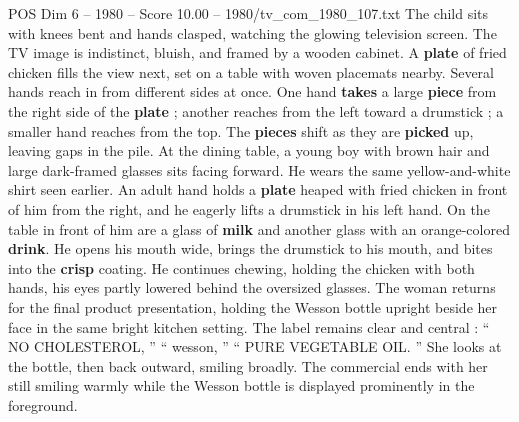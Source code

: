 \begin{textsample}{POS Dim 6 – 1980 – Score 10.00 – 1980/tv\_com\_1980\_107.txt}
The child sits with knees bent and hands clasped, watching the glowing television screen.
The TV image is indistinct, bluish, and framed by a wooden cabinet.
A \textbf{plate} of fried chicken fills the view next, set on a table with woven placemats nearby.
Several hands reach in from different sides at once.
One hand \textbf{takes} a large \textbf{piece} from the right side of the \textbf{plate} ; another reaches from the left toward a drumstick ; a smaller hand reaches from the top.
The \textbf{pieces} shift as they are \textbf{picked} up, leaving gaps in the pile.
At the dining table, a young boy with brown hair and large dark-framed glasses sits facing forward.
He wears the same yellow-and-white shirt seen earlier.
An adult hand holds a \textbf{plate} heaped with fried chicken in front of him from the right, and he eagerly lifts a drumstick in his left hand.
On the table in front of him are a glass of \textbf{milk} and another glass with an orange-colored \textbf{drink}.
He opens his mouth wide, brings the drumstick to his mouth, and bites into the \textbf{crisp} coating.
He continues chewing, holding the chicken with both hands, his eyes partly lowered behind the oversized glasses.
The woman returns for the final product presentation, holding the Wesson bottle upright beside her face in the same bright kitchen setting.
The label remains clear and central : “ NO CHOLESTEROL, ” “ wesson, ” “ PURE VEGETABLE OIL. ” She looks at the bottle, then back outward, smiling broadly.
The commercial ends with her still smiling warmly while the Wesson bottle is displayed prominently in the foreground.

\end{textsample}
